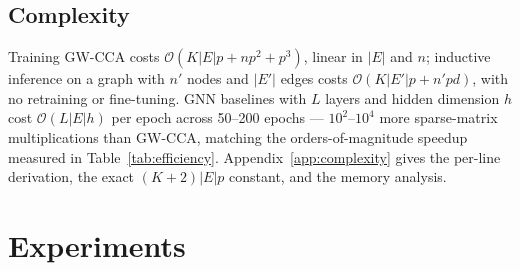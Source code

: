 \documentclass{article}
\begin{document}
\subsection{Complexity}
\label{sec:complexity}
Training GW-CCA costs $\mathcal{O}(K|E|p + np^2 + p^3)$, linear in $|E|$
and $n$; inductive inference on a graph with $n'$ nodes and $|E'|$ edges
costs $\mathcal{O}(K|E'|p + n'pd)$, with no retraining or fine-tuning.
GNN baselines with $L$ layers and hidden dimension $h$ cost
$\mathcal{O}(L|E|h)$ per epoch across 50--200 epochs --- $10^2$--$10^4$
more sparse-matrix multiplications than GW-CCA, matching the
orders-of-magnitude speedup measured in Table~\ref{tab:efficiency}.
Appendix~\ref{app:complexity} gives the per-line derivation, the exact
$(K{+}2)|E|p$ constant, and the memory analysis.

\begin{table}[t]
\caption{Dataset statistics. Node-inductive datasets use their default realistic split; PPI is graph-inductive (24 disjoint protein--protein-interaction graphs, split 20/2/2).}
\label{tab:datasets}
\centering
{}
\end{table}

\section{Experiments}
\label{sec:exp}
\end{document}
